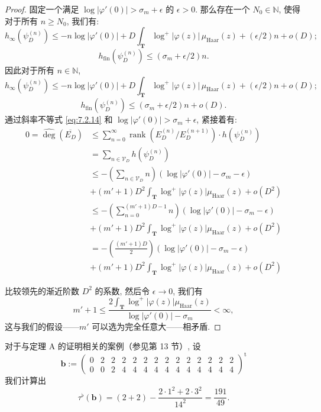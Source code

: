 \begin{proof}
固定一个满足 \(\log |\varphi'(0)| > \sigma_m + \epsilon\) 的 \(\epsilon > 0\). 
那么存在一个 \(N_0 \in \mathbb{N}\), 使得对于所有 \(n \geq N_0\), 我们有:
\[ h_{\infty}(\psi_D^{(n)}) \le -n \log |\varphi'(0)| + D \int_{\mathbf{T}} \log^+ |\varphi(z)| \, \mu_{\text{Haar}}(z) + (\epsilon/2)n + o(D); \]
\[ h_{\text{fin}}(\psi_D^{(n)}) \le (\sigma_m + \epsilon/2)n. \]
因此对于所有 \(n \in \mathbb{N}\),
\[ h_{\infty}(\psi_D^{(n)}) \le -n \log |\varphi'(0)| + D \int_{\mathbf{T}} \log^+ |\varphi(z)| \, \mu_{\text{Haar}}(z) + (\epsilon/2)n + o(D); \]
\[ h_{\text{fin}}(\psi_D^{(n)}) \le (\sigma_m + \epsilon/2)n + o(D). \]
通过斜率不等式 \eqref{eq:7.2.14} 和 \(\log |\varphi'(0)| > \sigma_m + \epsilon\), 紧接着有:
\begin{equation}\label{eq:7.3.18}
    \begin{aligned}
        0 = \widehat{\deg}(\overline{E_D}) 
        &\le \sum_{n=0}^{\infty} \operatorname{rank}(E_D^{(n)}/E_D^{(n+1)}) \cdot h(\psi_D^{(n)}) \\
        &= \sum_{n \in \mathcal{V}_D} h(\psi_D^{(n)}) \\
        &\le -\left(\sum_{n \in \mathcal{V}_D} n\right) (\log |\varphi'(0)| - \sigma_m - \epsilon) \\
        &+ (m'+1)D^2 \int_{\mathbf{T}} \log^+ |\varphi(z)| \mu_{\operatorname{Haar}}(z) + o(D^2) \\
        &\le -\left(\sum_{n=0}^{(m'+1)D-1} n\right) (\log |\varphi'(0)| - \sigma_m - \epsilon) \\
        &+ (m'+1)D^2 \int_{\mathbf{T}} \log^+ |\varphi(z)| \mu_{\operatorname{Haar}}(z) + o(D^2) \\
        &= -\left(\frac{(m'+1)D}{2}\right) (\log |\varphi'(0)| - \sigma_m - \epsilon) \\
        &+ (m'+1)D^2 \int_{\mathbf{T}} \log^+ |\varphi(z)| \mu_{\operatorname{Haar}}(z) + o(D^2)
    \end{aligned}
\end{equation}



比较领先的渐近阶数 \(D^2\) 的系数, 然后令 \(\epsilon \to 0\), 我们有
\[ m' + 1 \le \frac{2\int_{\mathbf{T}} \log^+ |\varphi(z)| \mu_{\text{Haar}}(z)}{\log |\varphi'(0)| - \sigma_m} < \infty, \]
这与我们的假设——\(m'\) 可以选为完全任意大——相矛盾.
\end{proof}

\begin{example}\label{ex:7.3.19}
对于与定理 A 的证明相关的案例（参见第 13 节）, 设
\begin{equation*}
\mathbf{b} := \begin{pmatrix}
0 & 2 & 2 & 2 & 2 & 2 & 2 & 2 & 2 & 2 & 2 & 2 & 2 & 2 \\
0 & 0 & 2 & 4 & 4 & 4 & 4 & 4 & 4 & 4 & 4 & 4 & 4 & 4
\end{pmatrix}^{\mathrm{t}}
\end{equation*}
我们计算出
\[ \tau^{\flat}(\mathbf{b}) = (2+2) - \frac{2 \cdot 1^2 + 2 \cdot 3^2}{14^2} = \frac{191}{49}. \]
\end{example}

